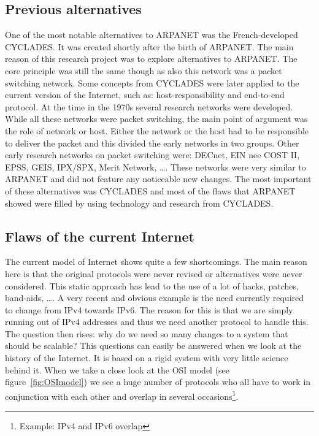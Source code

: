 \subsection{Previous alternatives}

One of the most notable alternatives to ARPANET was the French-developed CYCLADES. It was created shortly after the birth of ARPANET. The main reason of this research project was to explore alternatives to ARPANET. The core principle was still the same though as also this network was a packet switching network. Some concepts from CYCLADES were later applied to the current version of the Internet, such as: host-responsibility and end-to-end protocol. 
\npar
At the time in the 1970s several research networks were developed. While all these networks were packet switching, the main point of argument was the role of network or host. Either the network or the host had to be responsible to deliver the packet and this divided the early networks in two groups. Other early research networks on packet switching were: DECnet, EIN nee COST II, EPSS, GEIS, IPX/SPX, Merit Network, \ldots. These networks were very similar to ARPANET and did not feature any noticeable new changes. The most important of these alternatives was CYCLADES and most of the flaws that ARPANET showed were filled by using technology and research from CYCLADES.

\subsection{Flaws of the current Internet}
\label{ssec:Internet_shortcomings}

The current model of Internet shows quite a few shortcomings. The main reason here is that the original protocols were never revised or alternatives were never considered. This static approach has lead to the use of a lot of hacks, patches, band-aids, \ldots. A very recent and obvious example is the need currently required to change from IPv4 towards IPv6. The reason for this is that we are simply running out of IPv4 addresses and thus we need another protocol to handle this. The question then rises: why do we need so many changes to a system that should be scalable? This questions can easily be answered when we look at the history of the Internet. It is based on a rigid system with very little science behind it. When we take a close look at the OSI model (see figure~\ref{fig:OSImodel}) we see a huge number of protocols who all have to work in conjunction with each other and overlap in several occasions\footnote{Example: IPv4 and IPv6 overlap}. 

